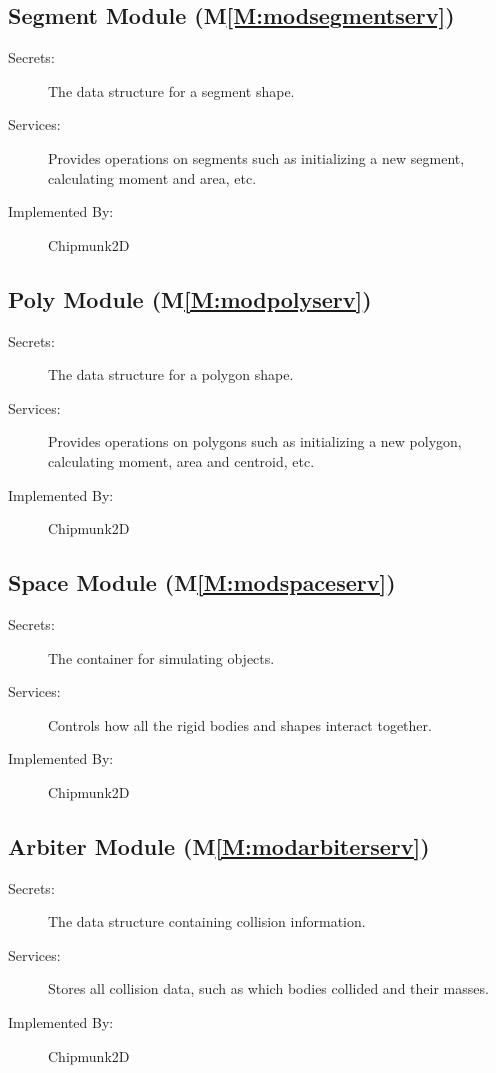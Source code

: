 \documentclass[12pt]{article}
\begin{document}
\subsection{Segment Module (M\ref{M:modsegmentserv})}
\label{Sec:SegmModu()}
\begin{description}
\item[Secrets:]The data structure for a segment shape.
\item[Services:]Provides operations on segments such as initializing a new segment, calculating moment and area, etc.
\item[Implemented By:]Chipmunk2D
\end{description}
\subsection{Poly Module (M\ref{M:modpolyserv})}
\label{Sec:PolyModu()}
\begin{description}
\item[Secrets:]The data structure for a polygon shape.
\item[Services:]Provides operations on polygons such as initializing a new polygon, calculating moment, area and centroid, etc.
\item[Implemented By:]Chipmunk2D
\end{description}
\subsection{Space Module (M\ref{M:modspaceserv})}
\label{Sec:SpacModu()}
\begin{description}
\item[Secrets:]The container for simulating objects.
\item[Services:]Controls how all the rigid bodies and shapes interact together.
\item[Implemented By:]Chipmunk2D
\end{description}
\subsection{Arbiter Module (M\ref{M:modarbiterserv})}
\label{Sec:ArbiModu()}
\begin{description}
\item[Secrets:]The data structure containing collision information.
\item[Services:]Stores all collision data, such as which bodies collided and their masses.
\item[Implemented By:]Chipmunk2D
\end{description}
\end{document}
